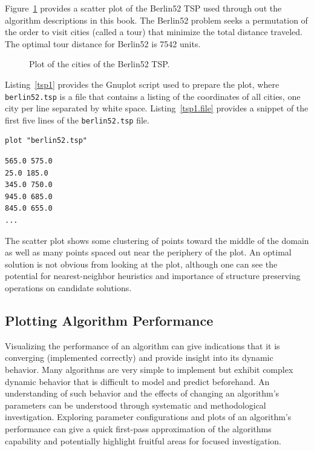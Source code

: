 Figure~\ref{plot:tsp1} provides a scatter plot of the Berlin52 TSP used through out the algorithm descriptions in this book. The Berlin52 problem seeks a permutation of the order to visit cities (called a tour) that minimize the total distance traveled. The optimal tour distance for Berlin52 is 7542 units. 

\begin{figure}[htp]
\centering

\caption{Plot of the cities of the Berlin52 TSP.}
\label{plot:tsp1}
\end{figure}

Listing~\ref{tsp1} provides the Gnuplot script used to prepare the plot, where \texttt{berlin52\-.tsp} is a file that contains a listing of the coordinates of all cities, one city per line separated by white space. Listing~\ref{tsp1.file} provides a snippet of the first five lines of the \texttt{berlin52\-.tsp} file.

\begin{lstlisting}[caption=Gnuplot script for plotting the Berlin52 TSP., label=tsp1]
plot "berlin52.tsp"
\end{lstlisting}

\begin{lstlisting}[caption=Snippet of the \texttt{berlin52.tsp} file., label=tsp1.file]
565.0 575.0
25.0 185.0
345.0 750.0
945.0 685.0
845.0 655.0
...
\end{lstlisting}

The scatter plot shows some clustering of points toward the middle of the domain as well as many points spaced out near the periphery of the plot. An optimal solution is not obvious from looking at the plot, although one can see the potential for nearest-neighbor heuristics and importance of structure preserving operations on candidate solutions.

%
%
\subsection{Plotting Algorithm Performance}
Visualizing the performance of an algorithm can give indications that it is converging (implemented correctly) and provide insight into its dynamic behavior. Many algorithms are very simple to implement but exhibit complex dynamic behavior that is difficult to model and predict beforehand. An understanding of such behavior and the effects of changing an algorithm's parameters can be understood through systematic and methodological investigation. Exploring parameter configurations and plots of an algorithm's performance can give a quick first-pass approximation of the algorithms capability and potentially highlight fruitful areas for focused investigation.

